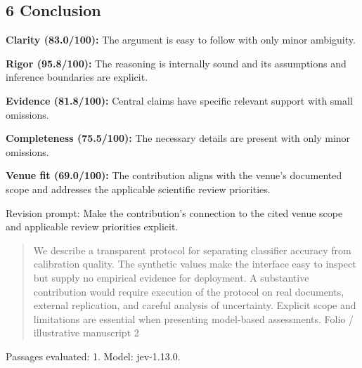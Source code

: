 \documentclass[11pt]{article}
\begin{document}
\subsection{6 Conclusion}
\par\textbf{Clarity (83.0/100):} The argument is easy to follow with only minor ambiguity.
\par\textbf{Rigor (95.8/100):} The reasoning is internally sound and its assumptions and inference boundaries are explicit.
\par\textbf{Evidence (81.8/100):} Central claims have specific relevant support with small omissions.
\par\textbf{Completeness (75.5/100):} The necessary details are present with only minor omissions.
\par\textbf{Venue fit (69.0/100):} The contribution aligns with the venue's documented scope and addresses the applicable scientific review priorities.
\par Revision prompt: Make the contribution's connection to the cited venue scope and applicable review priorities explicit.
\begin{quote}\small We describe a transparent protocol for separating classifier accuracy from calibration quality. The
synthetic values make the interface easy to inspect but supply no empirical evidence for deployment. A
substantive contribution would require execution of the protocol on real documents, external replication,
and careful analysis of uncertainty. Explicit scope and limitations are essential when presenting
model-based assessments.
Folio / illustrative manuscript                                      2\end{quote}
Passages evaluated: 1. Model: jev-1.13.0.
\end{document}
